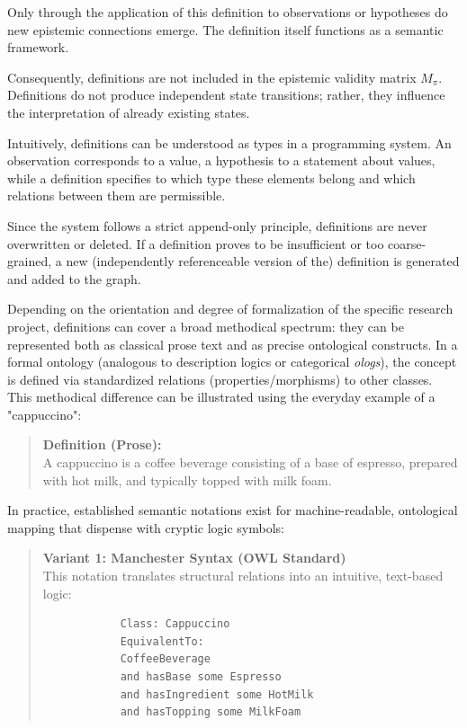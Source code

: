 \documentclass[11pt, a4paper]{article}
\begin{document}
	Only through the application of this definition to observations or hypotheses do new epistemic connections emerge. The definition itself functions as a semantic framework.
	
	Consequently, definitions are not included in the epistemic validity matrix $M_\pi$. Definitions do not produce independent state transitions; rather, they influence the interpretation of already existing states.
	
	Intuitively, definitions can be understood as types in a programming system. An observation corresponds to a value, a hypothesis to a statement about values, while a definition specifies to which type these elements belong and which relations between them are permissible.
	
	Since the system follows a strict append-only principle, definitions are never overwritten or deleted. If a definition proves to be insufficient or too coarse-grained, a new (independently referenceable version of the) definition is generated and added to the graph.
	
	Depending on the orientation and degree of formalization of the specific research project, definitions can cover a broad methodical spectrum: they can be represented both as classical prose text and as precise ontological constructs. In a formal ontology (analogous to description logics or categorical \emph{ologs}), the concept is defined via standardized relations (properties/morphisms) to other classes. This methodical difference can be illustrated using the everyday example of a "cappuccino":
	
	\begin{quote}
		\textbf{Definition (Prose):} \\
		A cappuccino is a coffee beverage consisting of a base of espresso, prepared with hot milk, and typically topped with milk foam.
	\end{quote}
	
	In practice, established semantic notations exist for machine-readable, ontological mapping that dispense with cryptic logic symbols:
	
	\begin{quote}
		\textbf{Variant 1: Manchester Syntax (OWL Standard)} \\
		This notation translates structural relations into an intuitive, text-based logic:
		\begin{verbatim}
			Class: Cappuccino
			EquivalentTo: 
			CoffeeBeverage 
			and hasBase some Espresso 
			and hasIngredient some HotMilk 
			and hasTopping some MilkFoam
		\end{verbatim}
	\end{quote}
	
\end{document}
